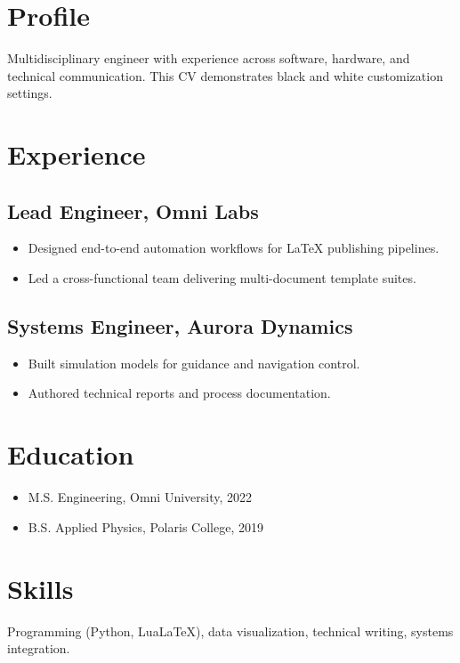 \documentclass[
    language=english,
    doctype=cv,
    institution=none,
    titlestyle=cv
]{../../omnilatex}
\begin{document}
\maketitle

\section*{Profile}
Multidisciplinary engineer with experience across software, hardware, and technical communication. This CV demonstrates black and white customization settings.

\section*{Experience}
\subsection*{Lead Engineer, Omni Labs}
\begin{itemize}
    \item Designed end-to-end automation workflows for LaTeX publishing pipelines.
    \item Led a cross-functional team delivering multi-document template suites.
\end{itemize}

\subsection*{Systems Engineer, Aurora Dynamics}
\begin{itemize}
    \item Built simulation models for guidance and navigation control.
    \item Authored technical reports and process documentation.
\end{itemize}

\section*{Education}
\begin{itemize}
    \item M.S. Engineering, Omni University, 2022
    \item B.S. Applied Physics, Polaris College, 2019
\end{itemize}

\section*{Skills}
Programming (Python, LuaLaTeX), data visualization, technical writing, systems integration.
\end{document}
